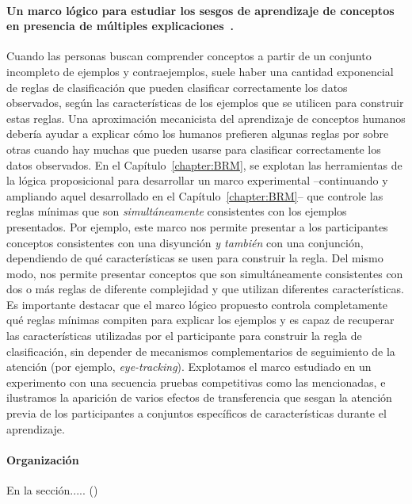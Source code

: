 \paragraph{Un marco lógico para estudiar los sesgos de aprendizaje de conceptos en presencia de múltiples explicaciones~\cite{tano2021framework}.}
Cuando las personas buscan comprender conceptos a partir de un conjunto incompleto de ejemplos y contraejemplos, suele haber una cantidad exponencial de reglas de clasificación que pueden clasificar correctamente los datos observados, según las características de los ejemplos que se utilicen para construir estas reglas. Una aproximación mecanicista del aprendizaje de conceptos humanos debería ayudar a explicar cómo los humanos prefieren algunas reglas por sobre otras cuando hay muchas que pueden usarse para clasificar correctamente los datos observados. En el Capítulo~\ref{chapter:BRM}, se explotan las herramientas de la lógica proposicional para desarrollar un marco experimental --continuando y ampliando aquel desarrollado en el Capítulo~\ref{chapter:BRM}-- que controle las reglas mínimas que son \textit{simultáneamente} consistentes con los ejemplos presentados. Por ejemplo, este marco nos permite presentar a los participantes conceptos consistentes con una disyunción \textit{y también} con una conjunción, dependiendo de qué características se usen para construir la regla. Del mismo modo, nos permite presentar conceptos que son simultáneamente consistentes con dos o más reglas de diferente complejidad y que utilizan diferentes características. Es importante destacar que el marco lógico propuesto controla completamente qué reglas mínimas compiten para explicar los ejemplos y es capaz de recuperar las características utilizadas por el participante para construir la regla de clasificación, sin depender de mecanismos complementarios de seguimiento de la atención (por ejemplo, {\em eye-tracking}). Explotamos el marco estudiado en un experimento con una secuencia pruebas competitivas como las mencionadas, e ilustramos la aparición de varios efectos de transferencia que sesgan la atención previa de los participantes a conjuntos específicos de características durante el aprendizaje.



\paragraph{Organización}
En la sección..... ()


